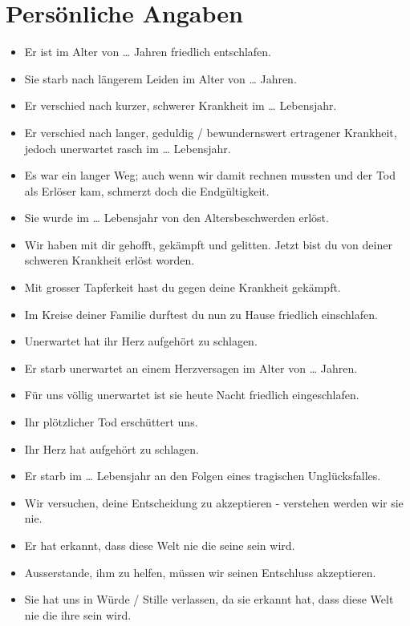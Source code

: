 \documentclass[ngerman,a4paper,11pt]{scrreprt}
\begin{document}
\section{Persönliche Angaben}
\label{sec-1-1-6}

\begin{itemize}
\item Er ist im Alter von \ldots{} Jahren friedlich entschlafen.
\item Sie starb nach längerem Leiden im Alter von \ldots{} Jahren.
\item Er verschied nach kurzer, schwerer Krankheit im \ldots{} Lebensjahr.
\item Er verschied nach langer, geduldig / bewundernswert ertragener Krankheit,
jedoch unerwartet rasch im \ldots{} Lebensjahr.
\item Es war ein langer Weg; auch wenn wir damit rechnen mussten und der Tod als
Erlöser kam, schmerzt doch die Endgültigkeit.
\item Sie wurde im \ldots{} Lebensjahr von den Altersbeschwerden erlöst.
\item Wir haben mit dir gehofft, gekämpft und gelitten. Jetzt bist du von deiner
schweren Krankheit erlöst worden.
\item Mit grosser Tapferkeit hast du gegen deine Krankheit gekämpft.
\item Im Kreise deiner Familie durftest du nun zu Hause friedlich einschlafen.
\item Unerwartet hat ihr Herz aufgehört zu schlagen.
\item Er starb unerwartet an einem Herzversagen im Alter von \ldots{} Jahren.
\item Für uns völlig unerwartet ist sie heute Nacht friedlich eingeschlafen.
\item Ihr plötzlicher Tod erschüttert uns.
\item Ihr Herz hat aufgehört zu schlagen.
\item Er starb im \ldots{} Lebensjahr an den Folgen eines tragischen Unglücksfalles.
\item Wir versuchen, deine Entscheidung zu akzeptieren - verstehen werden wir
sie nie.
\item Er hat erkannt, dass diese Welt nie die seine sein wird.
\item Ausserstande, ihm zu helfen, müssen wir seinen Entschluss akzeptieren.
\item Sie hat uns in Würde / Stille verlassen, da sie erkannt hat, dass diese
Welt nie die ihre sein wird.
\end{itemize}
\end{document}
